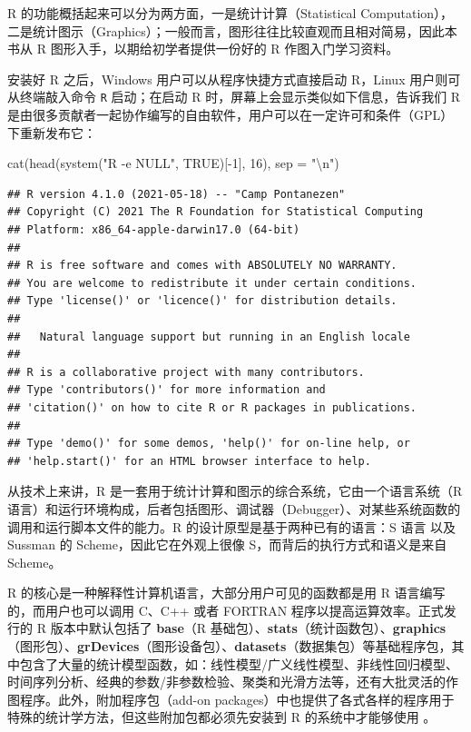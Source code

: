 \documentclass[
  b5paper,
  UTF8,twoside]{book}
\newenvironment{Shaded}{\begin{snugshade}}{\end{snugshade}}
\newcommand{\AttributeTok}[1]{\textcolor[rgb]{0.77,0.63,0.00}{#1}}
\newcommand{\ConstantTok}[1]{\textcolor[rgb]{0.00,0.00,0.00}{#1}}
\newcommand{\DecValTok}[1]{\textcolor[rgb]{0.00,0.00,0.81}{#1}}
\newcommand{\FunctionTok}[1]{\textcolor[rgb]{0.00,0.00,0.00}{#1}}
\newcommand{\NormalTok}[1]{#1}
\newcommand{\SpecialCharTok}[1]{\textcolor[rgb]{0.00,0.00,0.00}{#1}}
\newcommand{\StringTok}[1]{\textcolor[rgb]{0.31,0.60,0.02}{#1}}
\begin{document}
R 的功能概括起来可以分为两方面，一是统计计算（Statistical Computation），二是统计图示（Graphics）；一般而言，图形往往比较直观而且相对简易，因此本书从 R 图形入手，以期给初学者提供一份好的 R 作图入门学习资料。

安装好 R 之后，Windows 用户可以从程序快捷方式直接启动 R，Linux 用户则可从终端敲入命令 \texttt{R} 启动；在启动 R 时，屏幕上会显示类似如下信息，告诉我们 R 是由很多贡献者一起协作编写的自由软件，用户可以在一定许可和条件（GPL）下重新发布它：

\begin{Shaded}
\begin{Highlighting}[]
\FunctionTok{cat}\NormalTok{(}\FunctionTok{head}\NormalTok{(}\FunctionTok{system}\NormalTok{(}\StringTok{"R {-}e NULL"}\NormalTok{, }\ConstantTok{TRUE}\NormalTok{)[}\SpecialCharTok{{-}}\DecValTok{1}\NormalTok{], }\DecValTok{16}\NormalTok{), }\AttributeTok{sep =} \StringTok{"}\SpecialCharTok{\textbackslash{}n}\StringTok{"}\NormalTok{)}
\end{Highlighting}
\end{Shaded}

\begin{verbatim}
## R version 4.1.0 (2021-05-18) -- "Camp Pontanezen"
## Copyright (C) 2021 The R Foundation for Statistical Computing
## Platform: x86_64-apple-darwin17.0 (64-bit)
## 
## R is free software and comes with ABSOLUTELY NO WARRANTY.
## You are welcome to redistribute it under certain conditions.
## Type 'license()' or 'licence()' for distribution details.
## 
##   Natural language support but running in an English locale
## 
## R is a collaborative project with many contributors.
## Type 'contributors()' for more information and
## 'citation()' on how to cite R or R packages in publications.
## 
## Type 'demo()' for some demos, 'help()' for on-line help, or
## 'help.start()' for an HTML browser interface to help.
\end{verbatim}

从技术上来讲，R 是一套用于统计计算和图示的综合系统，它由一个语言系统（R 语言）和运行环境构成，后者包括图形、调试器（Debugger）、对某些系统函数的调用和运行脚本文件的能力。R 的设计原型是基于两种已有的语言：S 语言 \citep{Becker88} 以及 Sussman 的 Scheme，因此它在外观上很像 S，而背后的执行方式和语义是来自 Scheme。

R 的核心是一种解释性计算机语言，大部分用户可见的函数都是用 R 语言编写的，而用户也可以调用 C、C++ 或者 FORTRAN 程序以提高运算效率。正式发行的 R 版本中默认包括了 \textbf{base}（R 基础包）、\textbf{stats}（统计函数包）、\textbf{graphics}（图形包）、\textbf{grDevices}（图形设备包）、\textbf{datasets}（数据集包）等基础程序包，其中包含了大量的统计模型函数，如：线性模型/广义线性模型、非线性回归模型、时间序列分析、经典的参数/非参数检验、聚类和光滑方法等，还有大批灵活的作图程序。此外，附加程序包（add-on
packages）中也提供了各式各样的程序用于特殊的统计学方法，但这些附加包都必须先安装到 R 的系统中才能够使用 \citep{Hornik-FAQ}。
\end{document}
